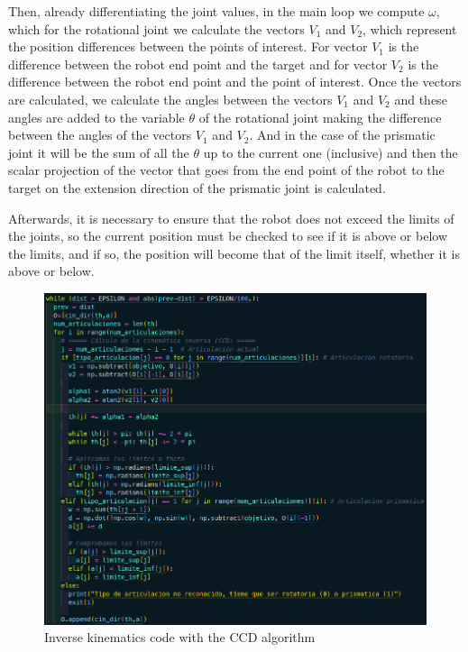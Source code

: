 \documentclass[11pt]{report}
\begin{document}
\newpage

Then, already differentiating the joint values, in the main loop we compute $\omega$, which for the rotational joint 
we calculate the vectors $V_1$ and $V_2$, which represent the position differences between the points of interest. 
For vector $V_1$ is the difference between the robot end point and the target and for vector $V_2$ is the difference 
between the robot end point and the point of interest. Once the vectors are calculated, we calculate the angles between 
the vectors $V_1$ and $V_2$ and these angles are added to the variable $\theta$ of the rotational joint making the
difference between the angles of the vectors $V_1$ and $V_2$. And in the case of the prismatic joint it will be the sum 
of all the $\theta$ up to the current one (inclusive) and then the scalar projection of the vector that goes from the end 
point of the robot to the target on the extension direction of the prismatic joint is calculated.

Afterwards, it is necessary to ensure that the robot does not exceed the limits of the joints, so the current position must 
be checked to see if it is above or below the limits, and if so, the position will become that of the limit itself, whether 
it is above or below.
\begin{figure}[H]
  \centering
  \includegraphics[scale=0.55]{img/codigo_ci_ccd.png}
  \caption{Inverse kinematics code with the CCD algorithm}
\end{figure}
\end{document}
